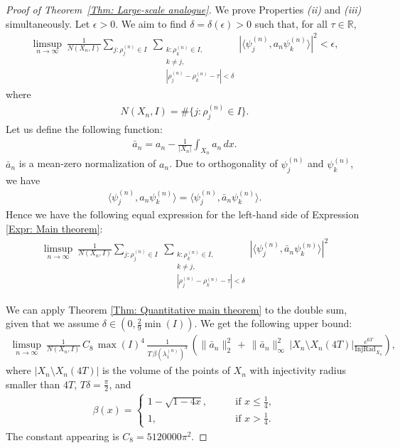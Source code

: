 \documentclass[11pt,twoside,reqno]{amsart} \usepackage{a4wide} \usepackage[T1]{fontenc} \usepackage[utf8]{inputenc} \usepackage{soul}  \usepackage{amsmath} \usepackage{amsfonts} \usepackage{amssymb} \usepackage{mathtools} \usepackage{amsthm} \usepackage{xcolor} \usepackage{graphicx} \usepackage{hyperref} \usepackage{standalone} \usepackage{esint} \usepackage{comment} \usepackage[left=2.3cm,top=3cm,right=2.3cm]{geometry} \usepackage{bm} \usepackage{svg} \usepackage{float} \numberwithin{equation}{section} \theoremstyle{plain} \newtheorem{thm}{Theorem}[section] \newtheorem{theorem}[thm]{Theorem} \newtheorem*{theorem*}{Theorem}\newtheorem{conj}[thm]{Conjecture} \newtheorem{lemma}[thm]{Lemma} \newtheorem{prop}[thm]{Proposition} \newtheorem{proposition}[thm]{Proposition} \newtheorem{cor}[thm]{Corollary} \newtheorem{question}[thm]{Question} \newtheorem{corollary}[thm]{Corollary} \newtheorem{assumption}[thm]{Assumption} \theoremstyle{definition} \newtheorem{defn}[thm]{Definition} \newtheorem{choice}[thm]{Choice} \newtheorem{definition}[thm]{Definition} \newtheorem{ex}[thm]{Example} \newtheorem{notation}[thm]{Notation} \newtheorem*{ack}{Acknowledgements} \theoremstyle{remark} \newtheorem{remark}[thm]{Remark} \newtheorem{bigremark}[thm]{Remark} \usepackage{xcolor} \newcommand{\red}[1]{ {\color{Red}#1} } \newcommand{\blue}[1]{ {\color{Blue}#1} } \author{Kai Hippi} \address{Aalto University, Espoo, Finland} \email{kai.hippi@aalto.fi}
\begin{document}
\begin{proof}[Proof of Theorem~\ref{Thm: Large-scale analogue}]
	We prove Properties \emph{(ii)} and \emph{(iii)} simultaneously. Let $\epsilon>0$. We aim to find $ \delta = \delta(\epsilon)>0$ such that, for all $\tau \in \mathbb{R}$,
\begin{align}
\label{Expr: Main theorem}
\limsup_{n\to\infty} \
\frac{1}{N(X_n,I)}
\sum_{j: \rho_j^{(n)} \in I}
\ \sum_{\substack{k:\rho_k^{(n)} \in I, \\ k \neq j, \\ | \rho_j^{(n)} - \rho_k^{(n)} - \tau| < \delta}}
\left|
\langle \psi_j^{(n)}, a_n \psi_k^{(n)} \rangle
\right|^2 
< \epsilon,
\end{align}
where
\begin{align*}
	N( X_{n}, I ) =  \# \{ j  :   \rho_{j}^{( n )} \in I \}.
\end{align*}
Let us define the following function:
\begin{align*}
	\bar{a}_{n} = a_{n} - \frac{1}{| X_{n} |} \int_{X_{n}} a_{n} \, dx.
\end{align*}
$ \bar{a}_{n} $ is a mean-zero normalization of $ a_{n} $. Due to orthogonality of $ \psi_{j}^{( n )} $ and $ \psi_{k}^{( n )} $, we have
\begin{align*}
	\langle \psi_{j}^{( n )} , a_{n} \psi_{k}^{( n )} \rangle = \langle \psi_{j}^{( n )}, \bar{a}_{n} \psi_{k}^{( n )} \rangle.
\end{align*}
Hence we have the following equal expression for the left-hand side of Expression \eqref{Expr: Main theorem}:
\begin{align*}
	\limsup_{n\to\infty} \
\frac{1}{N(X_n,I)}
\sum_{j: \rho_j^{(n)} \in I}
\ \sum_{\substack{k: \rho_k^{(n)} \in I, \\ k \neq j, \\ | \rho_j^{(n)} - \rho_k^{(n)} - \tau| < \delta}}
\left|
\langle \psi_j^{(n)}, \bar{a}_n \psi_k^{(n)} \rangle
\right|^2
\end{align*}

We can apply Theorem \ref{Thm: Quantitative main theorem} to the double sum, given that we assume $ \delta \in ( 0, \tfrac{2}{9} \min( I ) ) $. We get the following upper bound:
\begin{align}
	\label{Expr: Before properties}
	\limsup_{n \to \infty} \ \frac{1}{N( X_{n}, I )} \, C_{8} \, \max( I )^{4} \, \frac{1}{T \, \beta( \lambda_{1}^{(n)} )^{3}} \, \left( \| \bar{a}_{n} \|_{2}^{2} \, + \, \| \bar{a}_{n} \|_{\infty}^{2} \, | X_{n} \setminus X_{n}( 4T ) | \frac{e^{6 T}}{ \operatorname{InjRad}_{X_{n}} } \right),
\end{align}
where $ | X_{n} \setminus X_{n}( 4T ) | $ is the volume of the points of $ X_{n} $ with injectivity radius smaller than $ 4T $, $ T \delta = \tfrac{\pi}{2} $, and
\begin{align*}
	\beta( x ) =
	\begin{cases}	
		1 - \sqrt{1 - 4x}, \qquad & \text{if } x \leq \frac{1}{4},
		\\
		1, \qquad & \text{if } x > \frac{1}{4}.
	\end{cases}
\end{align*}
The constant appearing is $C_{8} = 5 120 000 \pi^{2}$.


\end{proof}
\end{document}
